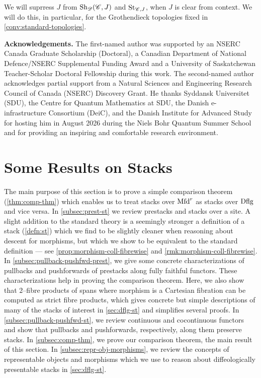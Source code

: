 \documentclass[11pt]{amsart}
\begin{document}
\begin{notn}
We will suprress $J$ from $\mathrm{Sh}_\mathscr{D}(\mathscr{C}, J)$ and $\mathrm{St}_{\mathscr{C}, J}$, when $J$ is clear from context.
We will do this, in particular, for the Grothendieck topologies fixed in
\cref{conv:standard-topologies}.
\end{notn}

\noindent\textbf{Acknowledgements.}
The first-named author was supported by
an NSERC Canada Graduate Scholarship (Doctoral),
a Canadian Department of National Defence/NSERC Supplemental Funding Award and
a University of Saskatchewan Teacher-Scholar Doctoral Fellowship during this work.
The second-named author acknowledges partial support from a Natural Sciences and Engineering
Research Council of Canada (NSERC) Discovery Grant. He thanks Syddansk Universitet (SDU),
the Centre for Quantum Mathematics at SDU, the Danish e-infrastructure Consortium (DeiC),
and the Danish Institute for Advanced Study for hosting him in August 2026 during the Niels
Bohr Quantum Summer School and for providing an inspiring and comfortable research environment.



\section{Some Results on Stacks}
\label{sec:prest-st}

The main purpose of this section is to prove a simple comparison theorem (\cref{thm:comp-thm}) which
enables us to treat stacks over $\mathrm{Mfd}^r$ as stacks over $\mathrm{Dflg}$ and vice versa.
In \cref{subsec:prest-st} we review prestacks and stacks over a site. A slight addition to the
standard theory is a seemingly stronger a definition of a stack (\cref{defn:st}) which we find to be
slightly cleaner when reasoning about descent for morphisms, but which we show to be equivalent to
the standard definition --- see \cref{prop:morphism-coll-fibrewise} and
\cref{rmk:morphism-coll-fibrewise}. In \cref{subsec:pullback-pushfwd-prest},
we give some concrete characterizations of pullbacks and pushforwards of prestacks
along fully faithful functors. These characterizations help in proving the comparison theorem.
Here, we also show that $2$--fibre products of spans where morphism is a Cartesian fibration
can be computed as strict fibre products, which gives concrete but simple descriptions of many of
the stacks of interest in \cref{sec:dflg-st} and simplifies several proofs.
In \cref{subsec:pullback-pushfwd-st}, we review continuous and cocontinuous functors and show that
pullbacks and pushforwards, respectively, along them preserve stacks.
In \cref{subsec:comp-thm}, we prove our comparison theorem, the main result of this section.
In \cref{subsec:repr-obj-morphisms}, we review the concepts of representable objects and morphisms
which we use to reason about diffeologically presentable stacks in \cref{sec:dflg-st}.
\end{document}
